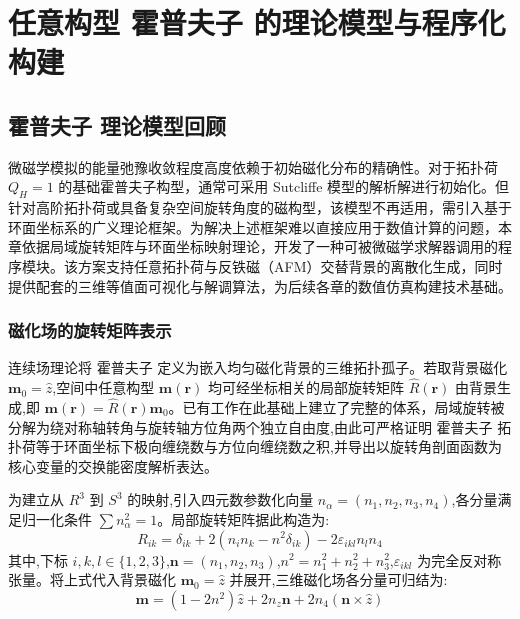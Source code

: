 \chapter{任意构型 霍普夫子 的理论模型与程序化构建}

\section{霍普夫子 理论模型回顾}

微磁学模拟的能量弛豫收敛程度高度依赖于初始磁化分布的精确性。对于拓扑荷 $Q_H=1$ 的基础霍普夫子构型，通常可采用 Sutcliffe 模型的解析解进行初始化。但针对高阶拓扑荷或具备复杂空间旋转角度的磁构型，该模型不再适用，需引入基于环面坐标系的广义理论框架\cite{guslienko2025magnetic}。为解决上述框架难以直接应用于数值计算的问题，本章依据局域旋转矩阵与环面坐标映射理论，开发了一种可被微磁学求解器调用的程序模块。该方案支持任意拓扑荷与反铁磁（AFM）交替背景的离散化生成，同时提供配套的三维等值面可视化与解调算法，为后续各章的数值仿真构建技术基础。

\subsection{磁化场的旋转矩阵表示}
连续场理论将 霍普夫子 定义为嵌入均匀磁化背景的三维拓扑孤子。若取背景磁化 $\mathbf{m}_0 = \hat{z}$,空间中任意构型 $\mathbf{m}(\mathbf{r})$ 均可经坐标相关的局部旋转矩阵 $\hat{R}(\mathbf{r})$ 由背景生成,即 $\mathbf{m}(\mathbf{r}) = \hat{R}(\mathbf{r}) \mathbf{m}_0$。已有工作\cite{guslienko2025magnetic}在此基础上建立了完整的体系，局域旋转被分解为绕对称轴转角与旋转轴方位角两个独立自由度,由此可严格证明 霍普夫子 拓扑荷等于环面坐标下极向缠绕数与方位向缠绕数之积,并导出以旋转角剖面函数为核心变量的交换能密度解析表达。

为建立从 $R^3$ 到 $S^3$ 的映射,引入四元数参数化向量 $n_\alpha = (n_1, n_2, n_3, n_4)$,各分量满足归一化条件 $\sum n_\alpha^2 = 1$。局部旋转矩阵据此构造为:
\begin{equation}
    R_{ik} = \delta_{ik} + 2(n_i n_k - n^2 \delta_{ik}) - 2\varepsilon_{ikl} n_l n_4
\end{equation}
其中,下标 $i, k, l \in \{1,2,3\}$,$\mathbf{n} = (n_1, n_2, n_3)$,$n^2 = n_1^2 + n_2^2 + n_3^2$,$\varepsilon_{ikl}$ 为完全反对称张量。将上式代入背景磁化 $\mathbf{m}_0 = \hat{z}$ 并展开,三维磁化场各分量可归结为:
\begin{equation}
    \mathbf{m} = (1 - 2n^2)\hat{z} + 2n_z \mathbf{n} + 2n_4(\mathbf{n} \times \hat{z})
    \label{eq:hopf_magnetization}
\end{equation}

